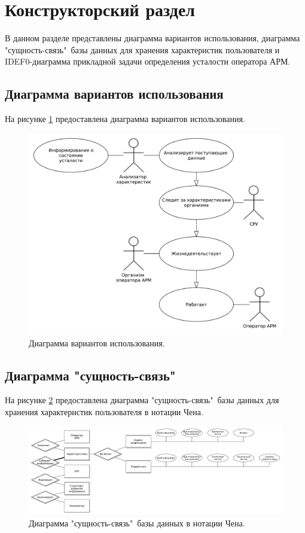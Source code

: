 \section{Конструкторский раздел}
В данном разделе представлены диаграмма вариантов использования, диаграмма "сущность-связь"\ базы данных для хранения характеристик пользователя и IDEF0-диаграмма прикладной задачи определения усталости оператора АРМ.

\subsection{Диаграмма вариантов использования}
На рисунке \ref{fig:useCase} предоставлена диаграмма вариантов использования.
\begin{figure}[H]
	\centering
	\includegraphics[width=\textwidth]{img/useCaseDiagramPresentation.pdf}
	\caption{Диаграмма вариантов использования.}
	\label{fig:useCase}
\end{figure}


\subsection{Диаграмма "сущность-связь"\ }
На рисунке \ref{fig:chen} предоставлена диаграмма "сущность-связь"\ базы данных для хранения характеристик пользователя в нотации Чена.
\begin{figure}[H]
	\centering
	\includegraphics[width=\textwidth]{img/chenERDiagram.pdf}
	\caption{Диаграмма "сущность-связь"\ базы данных в нотации Чена.}
	\label{fig:chen}
\end{figure}

